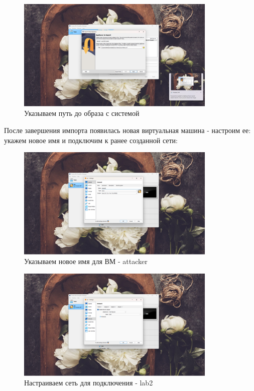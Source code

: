 \documentclass[a4paper]{article}
\begin{document}
  \begin{figure}[H]
    \centering
    \includegraphics[width=0.85\textwidth]{02_00 (3)}
    \caption{Указываем путь до образа с системой}
    \label{img:0003}
  \end{figure}

  После завершения импорта появилась новая виртуальная машина - настроим ее: укажем новое имя и 
  подключим к ранее созданной сети:

  \begin{figure}[H]
    \centering
    \includegraphics[width=0.85\textwidth]{02_00 (4)}
    \caption{Указываем новое имя для ВМ - attacker}
    \label{img:0004}
  \end{figure}

  \begin{figure}[H]
    \centering
    \includegraphics[width=0.85\textwidth]{02_00 (5)}
    \caption{Настраиваем сеть для подключения - lab2}
    \label{img:0005}
  \end{figure}
\end{document}
